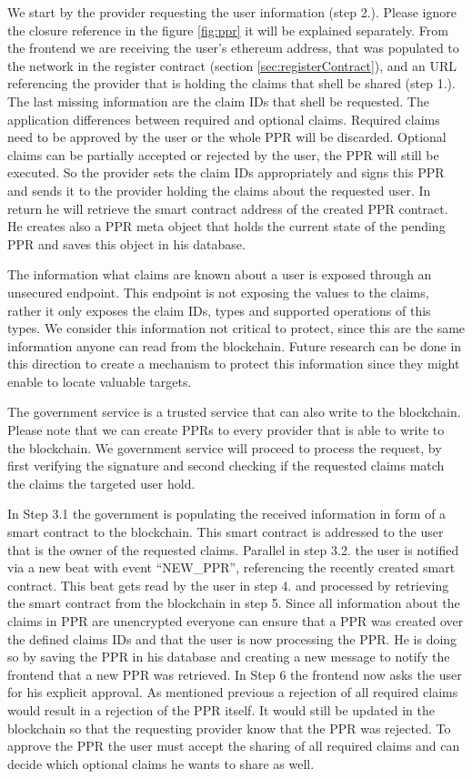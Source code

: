 We start by the provider requesting the user information (step 2.). Please ignore the closure reference in the figure \ref{fig:ppr} it will be explained separately. From the frontend we are receiving the user’s ethereum address, that was populated to the network in the register contract (section \ref{sec:registerContract}), and an URL referencing the provider that is holding the claims that shell be shared (step 1.). The last missing information are the claim IDs that shell be requested. The application differences between required and optional claims. Required claims need to be approved by the user or the whole PPR will be discarded. Optional claims can be partially accepted or rejected by the user, the PPR will still be executed. So the provider sets the claim IDs appropriately and signs this PPR and sends it to the provider holding the claims about the requested user. In return he will retrieve the smart contract address of the created PPR contract. He creates also a PPR meta object that holds the current state of the pending PPR and saves this object in his database. 

The information what claims are known about a user is exposed through an unsecured endpoint. This endpoint is not exposing the values to the claims, rather it only exposes the claim IDs, types and supported operations of this types. We consider this information not critical to protect, since this are the same information anyone can read from the blockchain. Future research can be done in this direction to create a mechanism to protect this information since they might enable to locate valuable targets. 

The government service is a trusted service that can also write to the blockchain. Please note that we can create PPRs to every provider that is able to write to the blockchain. We government service will proceed to process the request, by first verifying the signature and second checking if the requested claims match the claims the targeted user hold.  

In Step 3.1 the government is populating the received information in form of a smart contract to the blockchain. This smart contract is addressed to the user that is the owner of the requested claims. Parallel in step 3.2. the user is notified via a new beat with event “NEW\_PPR”, referencing the recently created smart contract.
This beat gets read by the user in step 4. and processed by retrieving the smart contract from the blockchain in step 5. Since all information about the claims in PPR are unencrypted everyone can ensure that a PPR was created over the defined claims IDs and that the user is now processing the PPR. He is doing so by saving the PPR in his database and creating a new message to notify the frontend that a new PPR was retrieved. In Step 6 the frontend now asks the user for his explicit approval. As mentioned previous a rejection of all required claims would result in a rejection of the PPR itself. It would still be updated in the blockchain so that the requesting provider know that the PPR was rejected. To approve the PPR the user must accept the sharing of all required claims and can decide which optional claims he wants to share as well.  

